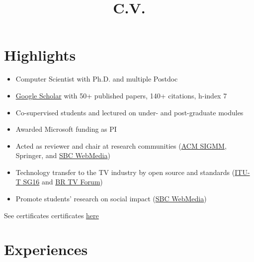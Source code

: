 \documentclass[10pt,a4paper,sans,colorlinks]{moderncv}
\title{C.V.}
\begin{document}
\setHyperrefBlueLinks
\makecvtitle
\vspace{-2em}

\section{Highlights}

\begin{itemize}
  \item Computer Scientist with Ph.D. and multiple Postdoc
  \item \href{https://scholar.google.com/citations?user=1bEOmkUAAAAJ&hl=en}{Google Scholar} with 50+ published papers, 140+ citations, h-index 7
  \item Co-supervised students and lectured on under- and post-graduate modules
  \item Awarded Microsoft funding as PI
  \item Acted as reviewer and chair at research communities (\href{http://sigmm.acm.org}{ACM SIGMM}, Springer, and \href{http://webmedia.org.br}{SBC WebMedia})
  \item Technology transfer to the TV industry by open source and standards (\href{http://www.itu.int/en/ITU-T/studygroups/2022-2024/16}{ITU-T SG16} and \href{http://forumsbtvd.org.br}{BR TV Forum})
  \item Promote  students' research on social impact (\href{https://webmedia.org.br/2022/en/lf-award/}{SBC WebMedia})
\end{itemize}

See certificates certificates \href{https://alanlivio.github.io/certificates.pdf}{here}

\section{Experiences}
\end{document}
